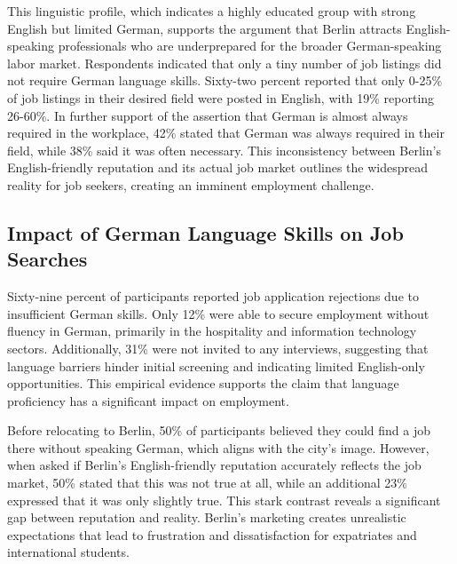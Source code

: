 This linguistic profile, which indicates a highly educated group with strong English but limited German, supports the argument that Berlin attracts English-speaking professionals who are underprepared for the broader German-speaking labor market. Respondents indicated that only a tiny number of job listings did not require German language skills. Sixty-two percent reported that only 0-25\% of job listings in their desired field were posted in English, with 19\% reporting 26-60\%. In further support of the assertion that German is almost always required in the workplace, 42\% stated that German was always required in their field, while 38\% said it was often necessary. This inconsistency between Berlin’s English-friendly reputation and its actual job market outlines the widespread reality for job seekers, creating an imminent employment challenge.


\subsection{Impact of German Language Skills on Job Searches}
Sixty-nine percent of participants reported job application rejections due to insufficient German skills. Only 12\% were able to secure employment without fluency in German, primarily in the hospitality and information technology sectors. Additionally, 31\% were not invited to any interviews, suggesting that language barriers hinder initial screening and indicating limited English-only opportunities. This empirical evidence supports the claim that language proficiency has a significant impact on employment.

Before relocating to Berlin, 50\% of participants believed they could find a job there without speaking German, which aligns with the city’s image. However, when asked if Berlin’s English-friendly reputation accurately reflects the job market, 50\% stated that this was not true at all, while an additional 23\% expressed that it was only slightly true. This stark contrast reveals a significant gap between reputation and reality. Berlin’s marketing creates unrealistic expectations that lead to frustration and dissatisfaction for expatriates and international students.

